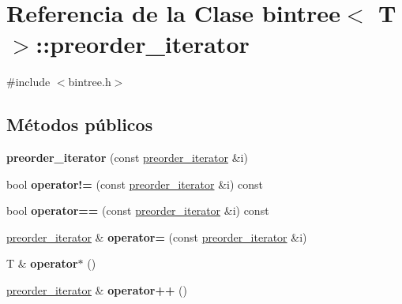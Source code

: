 \hypertarget{classbintree_1_1preorder__iterator}{}\section{Referencia de la Clase bintree$<$ T $>$\+:\+:preorder\+\_\+iterator}
\label{classbintree_1_1preorder__iterator}


{\ttfamily \#include $<$bintree.\+h$>$}

\subsection*{Métodos públicos}
\begin{DoxyCompactItemize}
\item 
{\bfseries preorder\+\_\+iterator} (const \hyperlink{classbintree_1_1preorder__iterator}{preorder\+\_\+iterator} \&i)\hypertarget{classbintree_1_1preorder__iterator_a68efecc720b7eeed8824f4070afaa56e}{}\label{classbintree_1_1preorder__iterator_a68efecc720b7eeed8824f4070afaa56e}

\item 
bool {\bfseries operator!=} (const \hyperlink{classbintree_1_1preorder__iterator}{preorder\+\_\+iterator} \&i) const \hypertarget{classbintree_1_1preorder__iterator_a0c270fba05a0d6357580ac22bd09de19}{}\label{classbintree_1_1preorder__iterator_a0c270fba05a0d6357580ac22bd09de19}

\item 
bool {\bfseries operator==} (const \hyperlink{classbintree_1_1preorder__iterator}{preorder\+\_\+iterator} \&i) const \hypertarget{classbintree_1_1preorder__iterator_af89d8bdcfc4e370b6e01ac6a895b2c1c}{}\label{classbintree_1_1preorder__iterator_af89d8bdcfc4e370b6e01ac6a895b2c1c}

\item 
\hyperlink{classbintree_1_1preorder__iterator}{preorder\+\_\+iterator} \& {\bfseries operator=} (const \hyperlink{classbintree_1_1preorder__iterator}{preorder\+\_\+iterator} \&i)\hypertarget{classbintree_1_1preorder__iterator_abd22c87f35d056ca06c0ad1d1e7aa3e8}{}\label{classbintree_1_1preorder__iterator_abd22c87f35d056ca06c0ad1d1e7aa3e8}

\item 
T \& {\bfseries operator$\ast$} ()\hypertarget{classbintree_1_1preorder__iterator_ae74ae100f2d01a6b7bcad308901daa58}{}\label{classbintree_1_1preorder__iterator_ae74ae100f2d01a6b7bcad308901daa58}

\item 
\hyperlink{classbintree_1_1preorder__iterator}{preorder\+\_\+iterator} \& {\bfseries operator++} ()\hypertarget{classbintree_1_1preorder__iterator_a13bf7273ea805ab74b49bcc954e2a1ea}{}\label{classbintree_1_1preorder__iterator_a13bf7273ea805ab74b49bcc954e2a1ea}

\end{DoxyCompactItemize}

